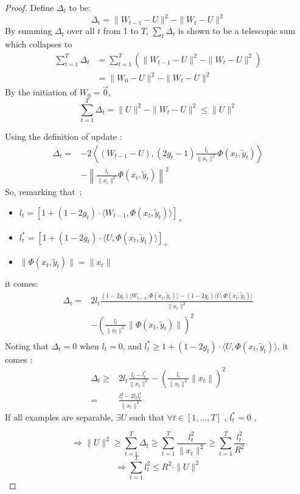 \documentclass[twocolumn]{article}
\begin{document}
\begin{proof}
	Define $\Delta_t$ to be:
	\[\Delta_t = \parallel{W_{t-1}-U}\parallel^2-\parallel{W_t-U}\parallel^2\]
	By summing $\Delta_t$ over all $t$ from 1 to $T$,  $\sum_t \Delta_t$ is shown to be a telescopic sum which collapses to
	\begin{align}
    \sum_{t=1}^{T}\Delta_t &= \sum_{t=1}^{T} \left( \parallel{W_{t-1} - U}\parallel^2-\parallel{W_t - U}\parallel^2 \right)\nonumber\\ 
    &= \parallel{W_0 - U}\parallel^2-\parallel{W_t-U}\parallel^2\nonumber
	\end{align}	
	By the initiation of $W_0 = \vec{0}$, 
	\begin{equation}
	\label{equa:delta}
	\sum_{t=1}^{T}\Delta_t = \parallel{U}\parallel^2 - \parallel{W_t-U}\parallel^2 \leqslant \parallel{U}\parallel^2 
	\end{equation}
	
	Using the definition of update : %
	\begin{align}
	\Delta_t =& -2\left\langle (W_{t-1} - U), (2g_t-1)\frac{l_t}{\parallel{x_t}\parallel^2}\Phi(x_t,\tilde{y}_t)\right\rangle \nonumber\\
	&- \left\| \frac{l_t}{\parallel{x_t}\parallel^2}\Phi(x_t,\tilde{y}_t)\right\|^2
	\nonumber
	\end{align}
	So, remarking that~:
	\begin{itemize}
		\item[] $l_t = [1+(1-2g_t)\cdot\langle W_{t-1},\Phi(x_t,\tilde{y}_t)\rangle]_+$
		\item[] $l_t^{\ast} = [1+(1-2g_t)\cdot\langle U,\Phi(x_t,\tilde{y}_t)\rangle]_+$
		\item[] $\parallel{\Phi(x_t,\tilde{y}_t)}\parallel = \parallel x_t\parallel$
	\end{itemize}
	it comes:
	\begin{align}
	\Delta_t =& 2l_t\frac{(1-2g_t)\langle W_{t-1}, \Phi(x_t,\tilde{y}_t)\rangle - (1-2g_t)\langle U, \Phi(x_t,\tilde{y}_t)\rangle}{\|x_t\|^2} \nonumber\\
	&-\left( \frac{l_t}{\parallel{x_t}\parallel^2}\parallel{\Phi(x_t,\tilde{y}_t)}\parallel \right)^2\nonumber\\
	\end{align}
	Noting that $\Delta_t = 0$ when $l_t = 0$, and $l^*_t \geq  1+(1-2g_t)\cdot\langle U,\Phi(x_t,\tilde{y}_t)\rangle$, it comes : 
	\begin{align}
	\Delta_t\geqslant& 2l_t\frac{l_t - l_t^{\ast}}{\parallel{x_t}\parallel^2}-\left( \frac{l_t}{\parallel{x_t}\parallel^2}\parallel x_t\parallel \right)^2\nonumber\\
	=& \frac{l_t^2-2l_t l_t^{\ast}}{\parallel x_t\parallel^2}\nonumber
	\end{align}
	If all examples are separable, $\exists U$ such that $\forall t \in [1,...,T]$ , $l_t^{\ast} = 0$ ,
	
	\[\Rightarrow \parallel{U}\parallel^2 \geqslant \sum_{t=1}^{T}\Delta_t \geqslant \sum_{t=1}^{T}  \frac{l_t^2}{\parallel{x_t}\parallel^2}
	\geqslant 
	\sum_{t=1}^{T}  \frac{l_t^2}{R^2}
	\]
	\[\Rightarrow\sum_{t=1}^{T} l_t^2 \leqslant R^2 \cdot \parallel{U}\parallel^2\]
\end{proof}
\end{document}
